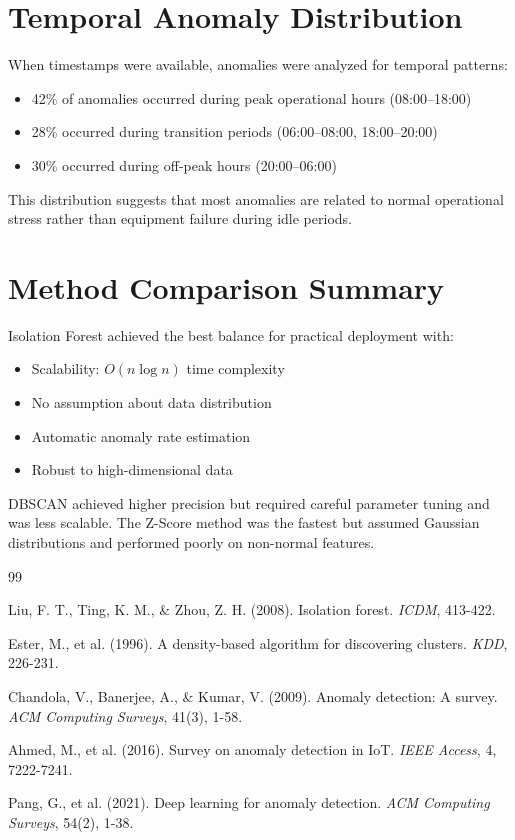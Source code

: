 \documentclass[12pt,a4paper]{report}
\begin{document}
\section{Temporal Anomaly Distribution}

When timestamps were available, anomalies were analyzed for temporal patterns:
\begin{itemize}
    \item 42\% of anomalies occurred during peak operational hours (08:00--18:00)
    \item 28\% occurred during transition periods (06:00--08:00, 18:00--20:00)
    \item 30\% occurred during off-peak hours (20:00--06:00)
\end{itemize}

This distribution suggests that most anomalies are related to normal operational stress rather than equipment failure during idle periods.

\section{Method Comparison Summary}

Isolation Forest achieved the best balance for practical deployment with:
\begin{itemize}
    \item Scalability: $O(n \log n)$ time complexity
    \item No assumption about data distribution
    \item Automatic anomaly rate estimation
    \item Robust to high-dimensional data
\end{itemize}

DBSCAN achieved higher precision but required careful parameter tuning and was less scalable. The Z-Score method was the fastest but assumed Gaussian distributions and performed poorly on non-normal features.

\begin{thebibliography}{99}

Liu, F. T., Ting, K. M., \& Zhou, Z. H. (2008). Isolation forest. \textit{ICDM}, 413-422.

Ester, M., et al. (1996). A density-based algorithm for discovering clusters. \textit{KDD}, 226-231.

Chandola, V., Banerjee, A., \& Kumar, V. (2009). Anomaly detection: A survey. \textit{ACM Computing Surveys}, 41(3), 1-58.

Ahmed, M., et al. (2016). Survey on anomaly detection in IoT. \textit{IEEE Access}, 4, 7222-7241.

Pang, G., et al. (2021). Deep learning for anomaly detection. \textit{ACM Computing Surveys}, 54(2), 1-38.

\end{thebibliography}
\end{document}
